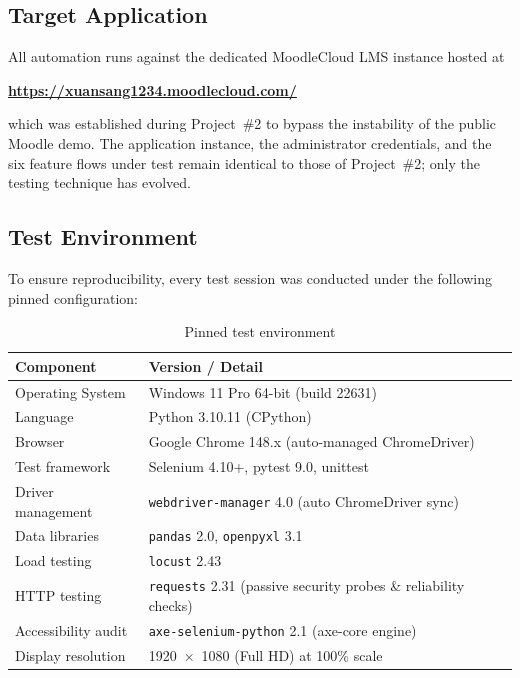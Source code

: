 \documentclass[twoside,final]{hcmut-report}
\begin{document}
\subsection{Target Application}
All automation runs against the dedicated MoodleCloud LMS instance hosted at
\begin{center}
    \textbf{\url{https://xuansang1234.moodlecloud.com/}}
\end{center}
which was established during Project~\#2 to bypass the instability of the public Moodle demo. The application instance, the administrator credentials, and the six feature flows under test remain identical to those of Project~\#2; only the testing technique has evolved.

\subsection{Test Environment}
To ensure reproducibility, every test session was conducted under the following pinned configuration:

\begin{table}[H]
\centering
\renewcommand{\arraystretch}{1.3}
\begin{tabularx}{\textwidth}{|l|X|}
\hline
\textbf{Component} & \textbf{Version / Detail} \\ \hline
Operating System & Windows 11 Pro 64-bit (build 22631) \\ \hline
Language & Python 3.10.11 (CPython) \\ \hline
Browser & Google Chrome 148.x (auto-managed ChromeDriver) \\ \hline
Test framework & Selenium 4.10+, pytest 9.0, unittest \\ \hline
Driver management & \texttt{webdriver-manager} 4.0 (auto ChromeDriver sync) \\ \hline
Data libraries & \texttt{pandas} 2.0, \texttt{openpyxl} 3.1 \\ \hline
Load testing & \texttt{locust} 2.43 \\ \hline
HTTP testing & \texttt{requests} 2.31 (passive security probes \& reliability checks) \\ \hline
Accessibility audit & \texttt{axe-selenium-python} 2.1 (axe-core engine) \\ \hline
Display resolution & 1920~$\times$~1080 (Full HD) at 100\% scale \\ \hline
\end{tabularx}
\caption{Pinned test environment}
\end{table}
\end{document}
